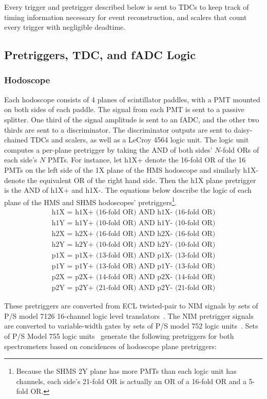 Every trigger and pretrigger described below is sent to TDCs to keep track of
timing information necessary for event reconstruction, and scalers that count
every trigger with negligible deadtime.

\subsection{Pretriggers, TDC, and fADC Logic}
\subsubsection{Hodoscope}
Each hodoscope consists of 4 planes of scintillator paddles, with a PMT mounted
on both sides of each paddle.
The signal from each PMT is sent to a passive splitter.
One third of the signal amplitude is sent to an fADC, and the other two thirds
are sent to a discriminator.
The discriminator outputs are sent to daisy-chained TDCs and scalers, as well
as a LeCroy 4564 logic unit.
The logic unit computes a per-plane pretrigger by taking the AND of both sides'
$N$-fold ORs of each side's $N$ PMTs.
For instance, let h1X+ denote the 16-fold OR of the 16 PMTs on the left side of
the 1X plane of the HMS hodoscope and similarly h1X- denote the equivalent OR
of the right hand side.
Then the h1X plane pretrigger is the AND of h1X+ and h1X-.
The equations below describe the logic of each plane of the HMS and SHMS
hodoscopes' pretriggers\footnote{Because the SHMS 2Y plane has more PMTs than
each logic unit has channels, each side's 21-fold OR is actually an OR of a
16-fold OR and a 5-fold OR.}.
\begin{align*}
    \text{h1X = h1X+ (16-fold OR) AND h1X- (16-fold OR)} \\
    \text{h1Y = h1Y+ (10-fold OR) AND h1Y- (10-fold OR)} \\
    \text{h2X = h2X+ (16-fold OR) AND h2X- (16-fold OR)} \\
    \text{h2Y = h2Y+ (10-fold OR) AND h2Y- (10-fold OR)}
\end{align*}
\begin{align*}
    \text{p1X = p1X+ (13-fold OR) AND p1X- (13-fold OR)} \\
    \text{p1Y = p1Y+ (13-fold OR) AND p1Y- (13-fold OR)} \\
    \text{p2X = p2X+ (14-fold OR) AND p2X- (14-fold OR)} \\
    \text{p2Y = p2Y+ (21-fold OR) AND p2Y- (21-fold OR)}
\end{align*}

These pretriggers are converted from ECL twisted-pair to NIM signals by sets of
P/S model 7126 16-channel logic level translators~\cite{PS7126_manual}.
The NIM pretrigger signals are converted to variable-width gates by sets of P/S
model 752 logic units~\cite{PS752_manual}.
Sets of P/S Model 755 logic units~\cite{PS755_manual} generate the following
pretriggers for both spectrometers based on concidences of hodoscope plane
pretriggers:

